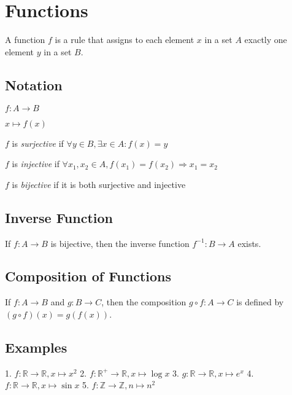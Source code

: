 \documentclass[12pt,a4paper]{article}
\begin{document}
\section{Functions}

A function $f$ is a rule that assigns to each element $x$ in a set $A$ exactly one element $y$ in a set $B$.

\subsection{Notation}

$f: A \to B$

$x \mapsto f(x)$

$f$ is \textit{surjective} if $\forall y \in B, \exists x \in A : f(x) = y$

$f$ is \textit{injective} if $\forall x_1, x_2 \in A, f(x_1) = f(x_2) \Rightarrow x_1 = x_2$

$f$ is \textit{bijective} if it is both surjective and injective

\subsection{Inverse Function}

If $f: A \to B$ is bijective, then the inverse function $f^{-1}: B \to A$ exists.

\subsection{Composition of Functions}

If $f: A \to B$ and $g: B \to C$, then the composition $g \circ f: A \to C$ is defined by $(g \circ f)(x) = g(f(x))$.

\subsection{Examples}

1. $f: \mathbb{R} \to \mathbb{R}, x \mapsto x^2$
2. $f: \mathbb{R}^+ \to \mathbb{R}, x \mapsto \log x$
3. $g: \mathbb{R} \to \mathbb{R}, x \mapsto e^x$
4. $f: \mathbb{R} \to \mathbb{R}, x \mapsto \sin x$
5. $f: \mathbb{Z} \to \mathbb{Z}, n \mapsto n^2$
\end{document}
